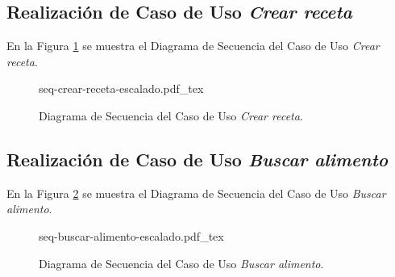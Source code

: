 \subsection{Realización de Caso de Uso \textit{Crear receta}}
En la Figura \ref{fig:secuencia-crear-receta} se muestra el Diagrama de Secuencia del Caso de Uso \textit{Crear receta}.


\begin{figure}
    \centering
    \begin{normalsize}
        {seq-crear-receta-escalado.pdf_tex}
    \end{normalsize}
    \caption{Diagrama de Secuencia del Caso de Uso \textit{Crear receta}.}
     \label{fig:secuencia-crear-receta}
 
 \end{figure}




\subsection{Realización de Caso de Uso \textit{Buscar alimento}}
En la Figura \ref{fig:secuencia-buscar-alimento}  se muestra el Diagrama de Secuencia del Caso de Uso \textit{Buscar alimento}.


\begin{figure}
    \centering
    \begin{normalsize}
        {seq-buscar-alimento-escalado.pdf_tex}
    \end{normalsize}
    \caption{Diagrama de Secuencia del Caso de Uso \textit{Buscar alimento}.}
     \label{fig:secuencia-buscar-alimento}
 
 \end{figure}









